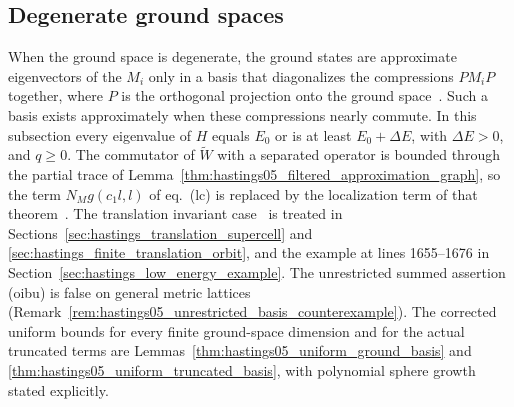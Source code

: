 \subsection*{Degenerate ground spaces}


When the ground space is degenerate, the ground states are approximate
eigenvectors of the $M_i$ only in a basis that diagonalizes the compressions
$PM_iP$ together, where $P$ is the orthogonal projection onto the ground
space~\cite[lines 395--491]{Hastings2006Solving}. Such a basis exists
approximately when these compressions nearly commute. In this subsection every
eigenvalue of $H$ equals $E_0$ or is at least $E_0+\Delta E$, with $\Delta E>0$,
and $q\ge0$. The commutator of $\widetilde W$ with a separated operator is
bounded through the partial trace of
Lemma~\ref{thm:hastings05_filtered_approximation_graph}, so the term
$N_Mg(c_1l,l)$ of eq.~(lc) is replaced by the localization term of that
theorem~\cite{gap:hastings05_filtered_term_approximation}. The translation
invariant case~\cite[lines 1603--1654]{Hastings2006Solving} is treated in
Sections~\ref{sec:hastings_translation_supercell} and
\ref{sec:hastings_finite_translation_orbit}, and the example at
lines 1655--1676 in Section~\ref{sec:hastings_low_energy_example}.
The unrestricted summed assertion (oibu) is false on general metric lattices
(Remark~\ref{rem:hastings05_unrestricted_basis_counterexample}). The corrected
uniform bounds for every finite ground-space dimension and for the actual
truncated terms are Lemmas~\ref{thm:hastings05_uniform_ground_basis} and
\ref{thm:hastings05_uniform_truncated_basis}, with polynomial sphere growth
stated explicitly.

